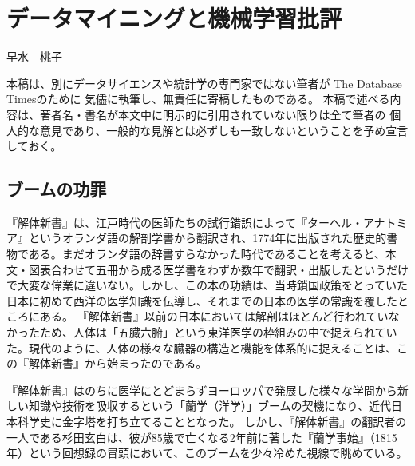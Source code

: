 
\chapter{データマイニングと機械学習批評}

\begin{flushright}
 早水　桃子 %
\end{flushright}

\begin{spacing}{0.6}
\noindent
{\footnotesize{本稿は、別にデータサイエンスや統計学の専門家ではない筆者が
The Database Timesのために
気儘に執筆し、無責任に寄稿したものである。
本稿で述べる内容は、著者名・書名が本文中に明示的に引用されていない限りは全て筆者の
個人的な意見であり、一般的な見解とは必ずしも一致しないということを予め宣言しておく。}}
\end{spacing}
 
\section{ブームの功罪}
『解体新書』は、江戸時代の医師たちの試行錯誤によって『ターヘル・アナトミア』というオランダ語の解剖学書から翻訳され、1774年に出版された歴史的書物である。まだオランダ語の辞書すらなかった時代であることを考えると、本文・図表合わせて五冊から成る医学書をわずか数年で翻訳・出版したというだけで大変な偉業に違いない。しかし、この本の功績は、当時鎖国政策をとっていた日本に初めて西洋の医学知識を伝導し、それまでの日本の医学の常識を覆したところにある。
『解体新書』以前の日本においては解剖はほとんど行われていなかったため、人体は「五臓六腑」という東洋医学の枠組みの中で捉えられていた。現代のように、人体の様々な臓器の構造と機能を体系的に捉えることは、この『解体新書』から始まったのである。

『解体新書』はのちに医学にとどまらずヨーロッパで発展した様々な学問から新しい知識や技術を吸収するという「蘭学（洋学）」ブームの契機になり、近代日本科学史に金字塔を打ち立てることとなった。
しかし、『解体新書』の翻訳者の一人である杉田玄白は、彼が85歳で亡くなる2年前に著した『蘭学事始』（1815年）という回想録の冒頭において、このブームを少々冷めた視線で眺めている。


